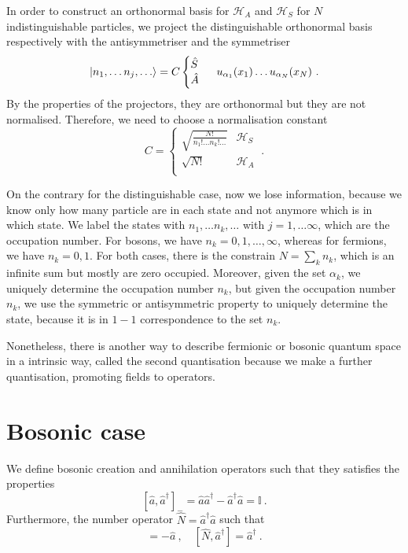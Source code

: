     In order to construct an orthonormal basis for $\mathcal H_A$ and $\mathcal H_S$ for $N$ indistinguishable particles, we project the distinguishable orthonormal basis respectively with the antisymmetriser and the symmetriser
    \begin{equation*}
        \vert n_1, \ldots n_j, \ldots\rangle = C \begin{cases} \hat S \\ \hat A \end{cases} ~ u_{\alpha_1}(x_1) \ldots u_{\alpha_N}(x_N) ~.
    \end{equation*}
    By the properties of the projectors, they are orthonormal but they are not normalised. Therefore, we need to choose a normalisation constant
    \begin{equation*}
        C = \begin{cases}
            \sqrt{\frac{N!}{n_1! \ldots n_k! \ldots}} & \mathcal H_S \\
            \sqrt{N!} & \mathcal H_A \\
        \end{cases} ~.
    \end{equation*}

    On the contrary for the distinguishable case, now we lose information, because we know only how many particle are in each state and not anymore which is in which state. We label the states with $n_1, \ldots n_k, \dots$ with $j=1, \ldots \infty$, which are the occupation number. For bosons, we have $n_k = 0, 1, \ldots, \infty$, whereas for fermions, we have $n_k = 0, 1$. For both cases, there is the constrain $N = \sum_k n_k$, which is an infinite sum but mostly are zero occupied. Moreover, given the set $\alpha_k$, we uniquely determine the occupation number $n_k$, but given the occupation number $n_k$, we use the symmetric or antisymmetric property to uniquely determine the state, because it is in $1-1$ correspondence to the set $n_k$. 

    Nonetheless, there is another way to describe fermionic or bosonic quantum space in a intrinsic way, called the second quantisation because we make a further quantisation, promoting fields to operators.

\section{Bosonic case}
   
    We define bosonic creation and annihilation operators such that they satisfies the properties 
    \begin{equation}\label{bos}
        [\hat a, \hat a^\dagger]_- = \hat a \hat a^\dagger - \hat a^\dagger \hat a = \mathbb I~.
    \end{equation}
    Furthermore, the number operator $\hat N = \hat a^\dagger \hat a$ such that 
    \begin{equation*}
        [\hat N, \hat a] = - \hat a~, \quad [\hat N, \hat a^\dagger] = \hat a^\dagger ~.
    \end{equation*} 

